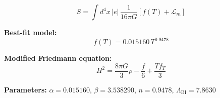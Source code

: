 
\begin{equation}
  S = \int d^4x \, |e| \, \frac{1}{16\pi G} \left[ f(T) + \mathcal{L}_m \right]
\end{equation}

\textbf{Best-fit model:}
\begin{equation}
  f(T) = 0.015160 \, T^{0.9478}
\end{equation}

\textbf{Modified Friedmann equation:}
\begin{equation}
  H^2 = \frac{8\pi G}{3} \rho - \frac{f}{6} + \frac{T f_T}{3}
\end{equation}

\textbf{Parameters:}
$\alpha = 0.015160$, \quad
$\beta = 3.538290$, \quad
$n = 0.9478$, \quad
$\Lambda_{\text{BI}} = 7.8630$